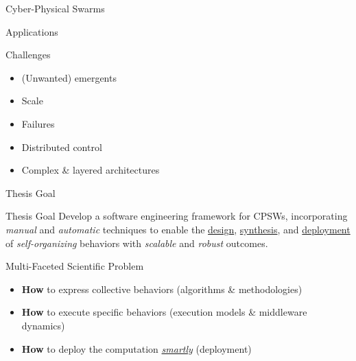 \documentclass[presentation, 8pt,169]{beamer}\mode<presentation>{\usetheme{AMSBolognaFC}}
\begin{document}
\begin{frame}{Cyber-Physical Swarms}
\begin{alertblock}{Applications}
\begin{center}
  \end{center}
\end{alertblock}
\begin{block}{Challenges}
  \begin{multicols}{3}
    \begin{itemize}
      \item (Unwanted) emergents
      \item Scale
      \item Failures
      \item Distributed control
      \item Complex \& layered architectures
    \end{itemize}
  \end{multicols}
\end{block}
\end{frame}
\begin{frame}{Thesis Goal}
  \begin{alertblock}{Thesis Goal}
    Develop a software engineering framework for CPSWs, 
    incorporating \emph{manual} and \emph{automatic} techniques to enable the \underline{design}, \underline{synthesis}, and \underline{deployment} of \emph{self-organizing} behaviors with \emph{scalable} and \emph{robust} outcomes.
  \end{alertblock}

  \begin{exampleblock}{Multi-Faceted Scientific Problem}
    \begin{itemize}
      \item \textbf{How} to express collective behaviors (algorithms \& methodologies)
      \item \textbf{How} to execute specific behaviors (execution models \& middleware dynamics)
      \item \textbf{How} to deploy the computation \emph{\underline{smartly}} (deployment) 
    \end{itemize}
  \end{exampleblock}
\end{frame}
\end{document}
